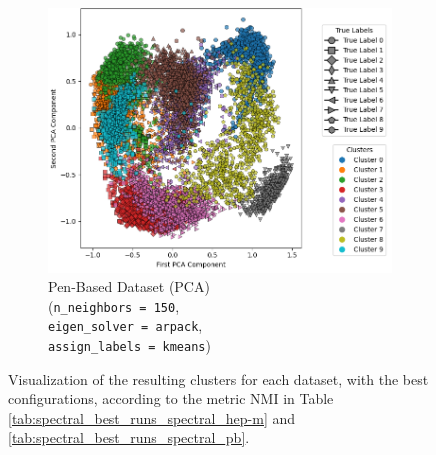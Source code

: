 \begin{figure}[H]
	\hfill
	\begin{subfigure}{0.32\textwidth}
		\centering
		\includegraphics[width=0.7\linewidth]{figures/Spectral/pen-based/best_run_NMI_pca.png}
		\caption{Pen-Based Dataset (PCA) \\ (\texttt{n\_neighbors = 150}, \\  \texttt{eigen\_solver = arpack}, \\ \texttt{assign\_labels = kmeans})}
	\end{subfigure}
	\caption{Visualization of the resulting clusters for each dataset, with the best configurations, according to the metric NMI 
	in Table \ref{tab:spectral_best_runs_spectral_hep-m} and \ref{tab:spectral_best_runs_spectral_pb}.}
	\label{fig:spectral-clusters-br-pca}
\end{figure}

